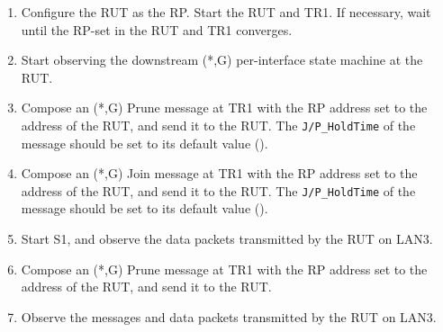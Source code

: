\documentclass[11pt]{report}
\begin{document}

\begin{enumerate}

  \item Configure the RUT as the RP. Start the RUT and TR1. If
  necessary, wait until the RP-set in the RUT and TR1 converges.

  \item Start observing the downstream (*,G) per-interface state
  machine at the RUT.

  \item Compose an (*,G) Prune message at TR1 with the RP address set
  to the address of the RUT, and send it to the RUT.
  The \verb=J/P_HoldTime= of the message should be set to its default
  value ({\PimsmJPHoldTime}).

  \item Compose an (*,G) Join message at TR1 with the RP address set
  to the address of the RUT, and send it to the RUT.
  The \verb=J/P_HoldTime= of the message should be set to its default
  value ({\PimsmJPHoldTime}).

  \item Start S1, and observe the data packets transmitted by the RUT on
  LAN3.

  \item Compose an (*,G) Prune message at TR1 with the RP address set
  to the address of the RUT, and send it to the RUT.

  \item Observe the messages and data packets transmitted by the RUT on
  LAN3.

\end{enumerate}

\end{document}

